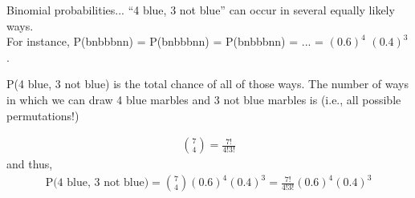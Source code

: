 \documentclass[aspectratio=169]{../latex_main/tntbeamer}  %
\begin{document}
	
		\begin{frame}{Binomial probabilities...}
	“4 blue, 3 not blue” can occur in several equally likely ways.\\                     For instance, P(bnbbbnn) = P(bnbbbnn) = P(bnbbbnn) = ... = $(0.6)^4$ $(0.4)^3$. \\         \bigskip
	    
	    P(4 blue, 3 not blue) is the total chance of all of those ways. The number of ways in which we can draw 4 blue marbles and 3 not blue marbles is (i.e., all possible permutations!)

        \begin{align*}
            \binom{7}{4} = \frac{7!}{4!3!}
        \end{align*}
    and thus,
    \begin{align*}
        \text{P(4 blue, 3 not blue)} = \binom{7}{4}(0.6)^4 (0.4)^3 = \frac{7!}{4!3!}(0.6)^4 (0.4)^3
    \end{align*}

	\end{frame}
	
\end{document}
